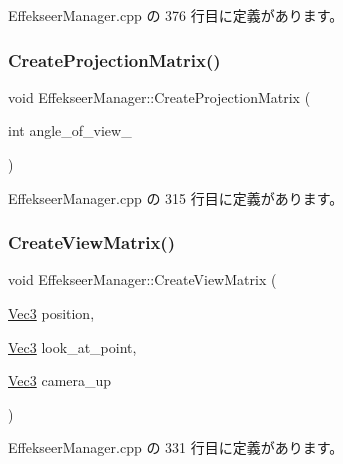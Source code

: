  Effekseer\+Manager.\+cpp の 376 行目に定義があります。

\mbox{\label{class_effekseer_manager_ae4faa1c46f9b4a372559567748df2384}} 
\subsubsection{\texorpdfstring{Create\+Projection\+Matrix()}{CreateProjectionMatrix()}}
{\footnotesize\ttfamily void Effekseer\+Manager\+::\+Create\+Projection\+Matrix (\begin{DoxyParamCaption}\item[{int}]{angle\+\_\+of\+\_\+view\+\_\+ }\end{DoxyParamCaption})\hspace{0.3cm}{\ttfamily [static]}}



 Effekseer\+Manager.\+cpp の 315 行目に定義があります。

\mbox{\label{class_effekseer_manager_ad36867f996af58d4b788a17cf25244a7}} 
\subsubsection{\texorpdfstring{Create\+View\+Matrix()}{CreateViewMatrix()}}
{\footnotesize\ttfamily void Effekseer\+Manager\+::\+Create\+View\+Matrix (\begin{DoxyParamCaption}\item[{\mbox{\hyperlink{_vector3_d_8h_ab16f59e4393f29a01ec8b9bbbabbe65d}{Vec3}}}]{position,  }\item[{\mbox{\hyperlink{_vector3_d_8h_ab16f59e4393f29a01ec8b9bbbabbe65d}{Vec3}}}]{look\+\_\+at\+\_\+point,  }\item[{\mbox{\hyperlink{_vector3_d_8h_ab16f59e4393f29a01ec8b9bbbabbe65d}{Vec3}}}]{camera\+\_\+up }\end{DoxyParamCaption})\hspace{0.3cm}{\ttfamily [static]}}



 Effekseer\+Manager.\+cpp の 331 行目に定義があります。

